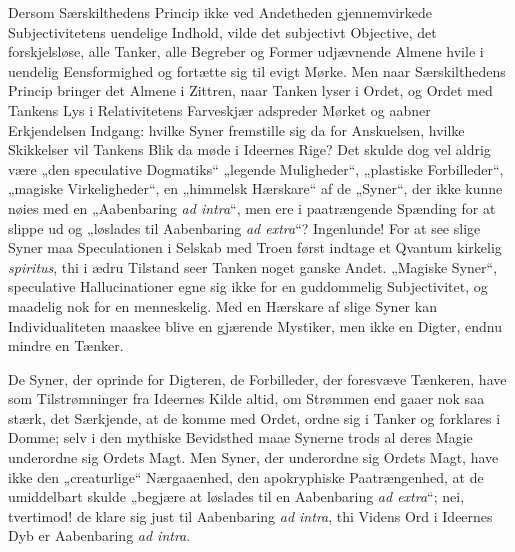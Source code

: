 \documentclass[12pt]{book}
\newcommand{\opage}[1]{\marginnote{\footnotesize\textit{[#1]}}}
\begin{document}
Dersom Særskilthedens Princip ikke ved Andetheden gjennemvirkede Subjectivitetens uendelige Indhold, vilde det subjectivt Objective, det forskjelsløse, alle Tanker, alle Begreber og Former udjævnende Almene hvile i uendelig Eensformighed og fortætte sig til evigt Mørke. Men naar Særskilthedens Princip bringer det Almene i Zittren, naar Tanken lyser i Ordet, og Ordet med Tankens Lys i Relativitetens Farveskjær adspreder Mørket og aabner Erkjendelsen Indgang: hvilke Syner fremstille sig da for Anskuelsen, hvilke Skikkelser vil Tankens Blik da møde i Ideernes Rige? Det skulde dog vel aldrig være „den speculative Dogmatiks“ „legende Muligheder“, „plastiske Forbilleder“, „magiske Virkeligheder“, en „himmelsk Hærskare“ af de „Syner“, der ikke kunne nøies med en „Aabenbaring \textit{ad intra}“, men ere i paatrængende Spænding for at slippe ud og „løslades til Aabenbaring \textit{ad extra}“? Ingenlunde! For at see slige Syner maa Speculationen i Selskab med Troen først indtage et Qvantum kirkelig \textit{spiritus}, thi i ædru Tilstand seer Tanken noget ganske Andet. „Magiske Syner“, speculative Hallucinationer egne sig ikke for en guddommelig Subjectivitet, og maadelig nok for en menneskelig. Med en Hærskare af slige Syner kan Individualiteten maaskee blive en gjærende Mystiker, men ikke en Digter, endnu mindre en Tænker.

De Syner, der oprinde for Digteren, de Forbilleder, der foresvæve Tænkeren, have som Tilstrømninger fra Ideernes Kilde altid, om Strømmen end gaaer nok saa stærk, det Særkjende, at de komme med Ordet, ordne sig i Tanker og forklares i Domme; selv i den mythiske Bevidsthed maae Synerne trods al deres Magie underordne sig Ordets Magt. Men Syner, der underordne sig Ordets Magt, have ikke den
\opage{346}„creaturlige“ Nærgaaenhed, den apokryphiske Paatrængenhed, at de umiddelbart skulde „begjære at løslades til en Aabenbaring \textit{ad extra}“; nei, tvertimod! de klare sig just til Aabenbaring \textit{ad intra}, thi Videns Ord i Ideernes Dyb er Aabenbaring \textit{ad intra}.
\end{document}
